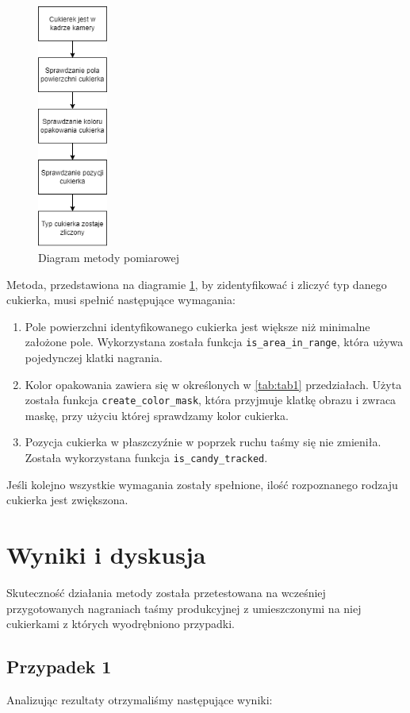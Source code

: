 \documentclass{article}
\begin{document}
\begin{figure}[H]
    \centering
    \includegraphics[height=8cm]{diagramMetody.png}
    \caption{Diagram metody pomiarowej}
    \label{fig:diagramMetody}
\end{figure}

Metoda, przedstawiona na diagramie \ref{fig:diagramMetody}, by zidentyfikować i zliczyć typ danego cukierka, musi spełnić następujące wymagania:
\begin{enumerate}
    \item Pole powierzchni identyfikowanego cukierka jest większe niż minimalne założone pole. Wykorzystana została funkcja \verb|is_area_in_range|, która używa pojedynczej klatki nagrania.
    \item Kolor opakowania zawiera się w określonych w \ref{tab:tab1} przedziałach. Użyta została funkcja \verb|create_color_mask|, która przyjmuje klatkę obrazu i zwraca maskę, przy użyciu której sprawdzamy kolor cukierka.
    \item Pozycja cukierka w płaszczyźnie w poprzek ruchu taśmy się nie zmieniła. Została wykorzystana funkcja \verb|is_candy_tracked|.
\end{enumerate}
Jeśli kolejno wszystkie wymagania zostały spełnione, ilość rozpoznanego rodzaju cukierka jest zwiększona.

\section{Wyniki i dyskusja}
\label{Wyniki i dyskusja}
Skuteczność działania metody została przetestowana na wcześniej przygotowanych nagraniach taśmy produkcyjnej z umieszczonymi na niej cukierkami z których wyodrębniono przypadki.
\subsection{Przypadek 1}
Analizując rezultaty otrzymaliśmy następujące wyniki:
\end{document}
